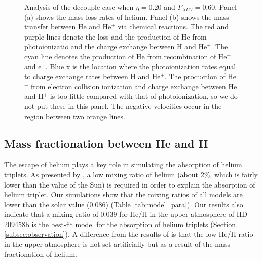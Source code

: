 \documentclass[journal, onecolumn]{aastex631}
\begin{document}
\begin{CJK*}{UTF8}{gbsn}
\begin{figure}[ht!]
\caption{Analysis of the decouple case when  $\eta = 0.20$ and $F_{XUV}=0.60$. Panel (a) shows the mass-loss rates of helium. Panel (b) shows the mass transfer between He and He$^+$ via chemical reactions. The red and purple lines denote the loss and the production of He from photoionizatio and the charge exchange between H and He$^+$. The cyan line denotes the production of He from recombination of He$^+$ and e$^-$. Blue x is the location where the photoionization rates equal to charge exchange rates between H and He$^+$. The production of He$^+$ from electron collision ionization and charge exchange between He and H$^+$ is too little compared with that of photoionization, so we do not put these in this panel. The negative velocities occur in the region between two orange lines.}
\label{fig:he_decouple}
\end{figure}

\subsection{Mass fractionation between He and H}\label{subsec:fraction}
The escape of helium plays a key role in simulating the absorption of helium triplets. As presented by \cite{Lampon2020}, a low mixing ratio of helium (about 2\%, which is fairly lower than the value of the Sun) is required in order to explain the absorption of helium triplet. Our simulations show that the mixing ratios of all models are lower than the solar value (0.086) (Table  \ref{tab:model_para}). Our results also indicate that a mixing ratio of 0.039 for He/H in the upper atmosphere of HD 209458b is the best-fit model for the absorption of helium triplets (Section \ref{subsec:observation}). A difference from the results of \cite{Lampon2020} is that the low He/H ratio in the upper atmosphere is not set artificially but as a result of the mass fractionation of helium.


\end{CJK*}
\end{document}
